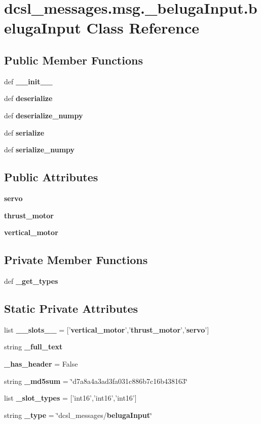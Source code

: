 \section{dcsl\-\_\-messages.\-msg.\-\_\-beluga\-Input.\-beluga\-Input \-Class \-Reference}
\label{classdcsl__messages_1_1msg_1_1__belugaInput_1_1belugaInput}
\subsection*{\-Public \-Member \-Functions}
\begin{DoxyCompactItemize}
\item 
def {\bf \-\_\-\-\_\-init\-\_\-\-\_\-}
\item 
def {\bf deserialize}
\item 
def {\bf deserialize\-\_\-numpy}
\item 
def {\bf serialize}
\item 
def {\bf serialize\-\_\-numpy}
\end{DoxyCompactItemize}
\subsection*{\-Public \-Attributes}
\begin{DoxyCompactItemize}
\item 
{\bf servo}
\item 
{\bf thrust\-\_\-motor}
\item 
{\bf vertical\-\_\-motor}
\end{DoxyCompactItemize}
\subsection*{\-Private \-Member \-Functions}
\begin{DoxyCompactItemize}
\item 
def {\bf \-\_\-get\-\_\-types}
\end{DoxyCompactItemize}
\subsection*{\-Static \-Private \-Attributes}
\begin{DoxyCompactItemize}
\item 
list {\bf \-\_\-\-\_\-slots\-\_\-\-\_\-} = ['{\bf vertical\-\_\-motor}','{\bf thrust\-\_\-motor}','{\bf servo}']
\item 
string {\bf \-\_\-full\-\_\-text}
\item 
{\bf \-\_\-has\-\_\-header} = \-False
\item 
string {\bf \-\_\-md5sum} = \char`\"{}d7a8a4a3ad3fa031c886b7c16b438163\char`\"{}
\item 
list {\bf \-\_\-slot\-\_\-types} = ['int16','int16','int16']
\item 
string {\bf \-\_\-type} = \char`\"{}dcsl\-\_\-messages/{\bf beluga\-Input}\char`\"{}
\end{DoxyCompactItemize}


